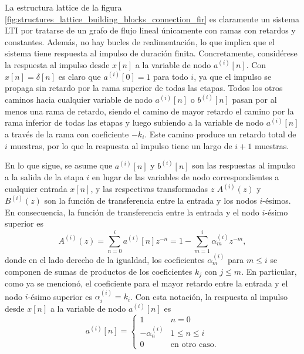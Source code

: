\documentclass[a4paper]{report}
\begin{document}
La estructura lattice de la figura \ref{fig:structures_lattice_building_blocks_connection_fir} es claramente un sistema LTI por tratarse de un grafo de flujo lineal únicamente con ramas con retardos y constantes. Además, no hay bucles de realimentación, lo que implica que el sistema tiene respuesta al impulso de duración finita. Concretamente, considérese la respuesta al impulso desde \(x[n]\) a la variable de nodo \(a^{(i)}[n]\). Con \(x[n]=\delta[n]\) es claro que \(a^{(i)}[0]=1\) para todo \(i\), ya que el impulso se propaga sin retardo por la rama superior de todas las etapas. Todos los otros caminos hacia cualquier variable de nodo \(a^{(i)}[n]\) o \(b^{(i)}[n]\) pasan por al menos una rama de retardo, siendo el camino de mayor retardo el camino por la rama inferior de todas las etapas y luego subiendo a la variable de nodo \(a^{(i)}[n]\) a través de la rama  con coeficiente \(-k_i\). Este camino produce un retardo total de \(i\) muestras, por lo que la respuesta al impulso tiene un largo de \(i+1\) muestras.

En lo que sigue, se asume que \(a^{(i)}[n]\) y \(b^{(i)}[n]\) son las respuestas al impulso a la salida de la etapa \(i\) en lugar de las variables de nodo correspondientes a cualquier entrada \(x[n]\), y las respectivas transformadas \(z\) \(A^{(i)}(z)\) y \(B^{(i)}(z)\) son la función de transferencia entre la entrada y los nodos \(i\)-ésimos. En consecuencia, la función de transferencia entre la entrada y el nodo \(i\)-ésimo superior es
\begin{equation}\label{eq:structures_lattice_Ai_z_transform}
 A^{(i)}(z)=\sum_{n=0}^{i}a^{(i)}[n]z^{-n}=1-\sum_{m=1}^{i}\alpha^{(i)}_mz^{-m}, 
\end{equation}
donde en el lado derecho de la igualdad, los coeficientes \(\alpha^{(i)}_m\) para \(m\leq i\) se componen de sumas de productos de los coeficientes \(k_j\) con \(j\leq m\). En particular, como ya se mencionó, el coeficiente para el mayor retardo entre la entrada y el nodo \(i\)-ésimo superior es \(\alpha^{(i)}_i=k_i\). Con esta notación, la respuesta al impulso desde \(x[n]\) a la variable de nodo \(a^{(i)}[n]\) es
\[
 a^{(i)}[n]=
 \left\{ 
  \begin{array}{ll}
   1 & n=0\\
   -\alpha^{(i)}_n & 1\leq n\leq i\\
   0 & \textrm{en otro caso.}
  \end{array}
 \right.
\]
\end{document}
